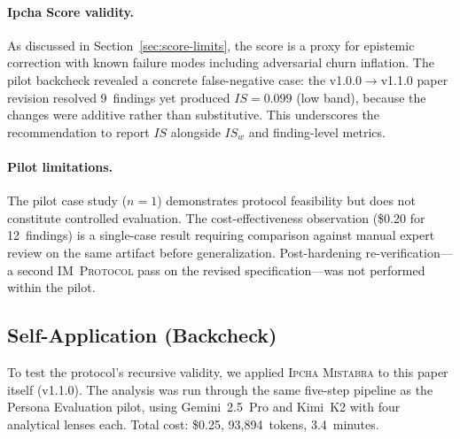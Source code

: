 \documentclass[11pt,a4paper]{article}
\newcommand{\methodname}{\textsc{Ipcha Mistabra}}
\newcommand{\protshort}{\textsc{IM~Protocol}}
\begin{document}
\paragraph{Ipcha Score validity.}
As discussed in Section~\ref{sec:score-limits}, the score is a proxy for epistemic correction with known failure modes including adversarial churn inflation.
The pilot backcheck revealed a concrete false-negative case: the v1.0.0$\to$v1.1.0 paper revision resolved 9~findings yet produced $\mathit{IS} = 0.099$ (low band), because the changes were additive rather than substitutive.
This underscores the recommendation to report $\mathit{IS}$ alongside $\mathit{IS}_w$ and finding-level metrics.

\paragraph{Pilot limitations.}
The pilot case study ($n=1$) demonstrates protocol feasibility but does not constitute controlled evaluation.
The cost-effectiveness observation (\$0.20 for 12~findings) is a single-case result requiring comparison against manual expert review on the same artifact before generalization.
Post-hardening re-verification---a second \protshort{} pass on the revised specification---was not performed within the pilot.

\subsection{Self-Application (Backcheck)}
\label{sec:backcheck}
To test the protocol's recursive validity, we applied \methodname{} to this paper itself (v1.1.0).
The analysis was run through the same five-step pipeline as the Persona Evaluation pilot, using Gemini~2.5~Pro and Kimi~K2 with four analytical lenses each.
Total cost: \$0.25, 93{,}894~tokens, 3.4~minutes.
\end{document}
